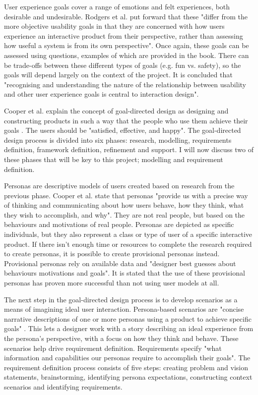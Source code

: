 \documentclass[authoryearcitations]{UoYCSproject}
\begin{document}
User experience goals cover a range of emotions and felt experiences, both desirable and undesirable. Rodgers et al. put forward that these "differ from the more objective usability goals in that they are concerned with how users experience an interactive product from their perspective, rather than assessing how useful a system is from its own perspective". Once again, these goals can be assessed using questions, examples of which are provided in the book. There can be trade-offs between these different types of goals (e.g. fun vs. safety), so the goals will depend largely on the context of the project. It is concluded that "recognising and understanding the nature of the relationship between usability and other user experience goals is central to interaction design". 

Cooper et al. explain the concept of goal-directed design as designing and constructing products in such a way that the people who use them achieve their goals \citep{Cooper2007}. The users should be "satisfied, effective, and happy". The goal-directed design process is divided into six phases: research, modelling, requirements definition, framework definition, refinement and support. I will now discuss two of these phases that will be key to this project; modelling and requirement definition. 

Personas are descriptive models of users created based on research from the previous phase. Cooper et al. state that personas "provide us with a precise way of thinking and communicating about how users behave, how they think, what they wish to accomplish, and why". They are not real people, but based on the behaviours and motivations of real people. Personas are depicted as specific individuals, but they also represent a class or type of user of a specific interactive product. If there isn't enough time or resources to complete the research required to create personas, it is possible to create provisional personas instead. Provisional personas rely on available data and "designer best guesses about behaviours motivations and goals". It is stated that the use of these provisional personas has proven more successful than not using user models at all.

The next step in the goal-directed design process is to develop scenarios as a means of imagining ideal user interaction. Persona-based scenarios are "concise narrative descriptions of one or more personas using a product to achieve specific goals" \citep{Cooper2007}. This lets a designer work with a story describing an ideal experience from the persona's perspective, with a focus on how they think and behave. These scenarios help drive requirement definition. Requirements specify "what information and capabilities our personas require to accomplish their goals". The requirement definition process consists of five steps: creating problem and vision statements, brainstorming, identifying persona expectations, constructing context scenarios and identifying requirements.
\end{document}
